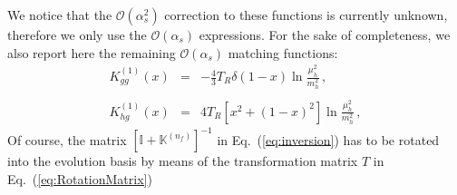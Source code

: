 \documentclass[10pt,a4paper]{article}
\begin{document}
We notice that the $\mathcal{O}(\alpha_s^2)$ correction to these
functions is currently unknown, therefore we only use the
$\mathcal{O}(\alpha_s)$ expressions. For the sake of completeness, we
also report here the remaining $\mathcal{O}(\alpha_s)$ matching
functions:
\begin{equation}
\begin{array}{rcl}
\displaystyle K_{gg}^{(1)}(x) &=&\displaystyle -\frac{4}{3}T_R\delta(1-x)\ln\frac{\mu_h^2}{m_h^2}\,,\\
\\
\displaystyle K_{hg}^{(1)}(x) &=&\displaystyle 4T_R\left[x^2+(1-x)^2\right]\ln\frac{\mu_h^2}{m_h^2}\,,
\end{array}
\end{equation}
Of course, the matrix
$\left[\mathbb{I}+\mathbb{K}^{(n_f)}\right]^{-1}$ in
Eq.~(\ref{eq:inversion}) has to be rotated into the evolution basis by
means of the transformation matrix $T$ in
Eq.~(\ref{eq:RotationMatrix})
\end{document}
